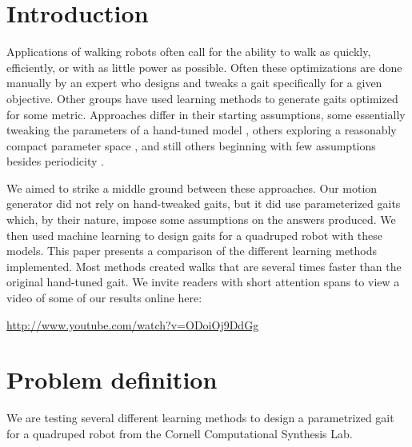 \section{Introduction}


Applications of walking robots often call for the ability to walk as
quickly, efficiently, or with as little power as possible.  Often
these optimizations are done manually by an expert who designs and
tweaks a gait specifically for a given objective.  Other groups have
used learning methods to generate gaits optimized for some metric.
Approaches differ in their starting assumptions, some essentially
tweaking the parameters of a hand-tuned model \cite{chernova}, others
exploring a reasonably compact parameter space \cite{kohl}, and still
others beginning with few assumptions besides periodicity
\cite{zykov}.

We aimed to strike a middle ground between these approaches.  Our
motion generator did not rely on hand-tweaked gaits, but it did use
parameterized gaits which, by their nature, impose some assumptions on
the answers produced.  We then used machine learning to design gaits
for a quadruped robot with these models.  This paper presents a
comparison of the different learning methods implemented.  Most
methods created walks that are several times faster than the original
hand-tuned gait.  We invite readers with short attention spans to view
a video of some of our results online here:

\url{http://www.youtube.com/watch?v=ODoiOj9DdGg}




\section{Problem definition}

We are testing several different learning methods to design a
parametrized gait for a quadruped robot from the Cornell Computational
Synthesis Lab.

